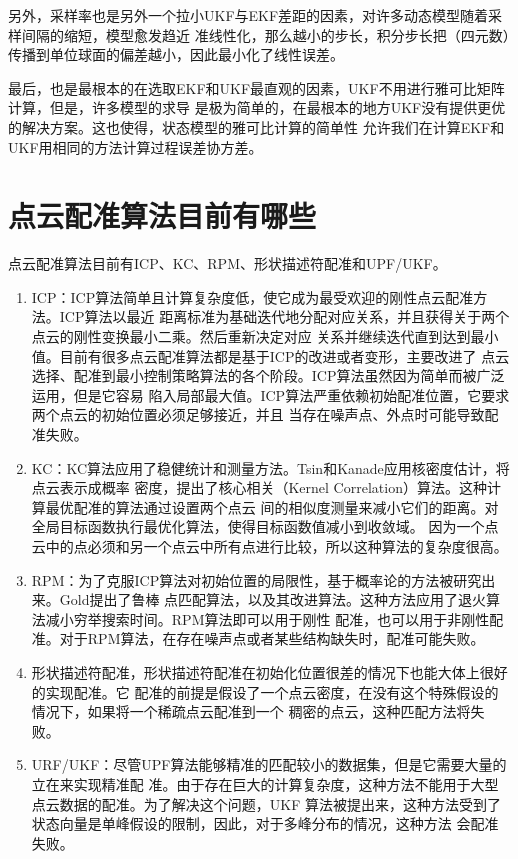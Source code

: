 \documentclass[10pt]{article}
\begin{document}
另外，采样率也是另外一个拉小UKF与EKF差距的因素，对许多动态模型随着采样间隔的缩短，模型愈发趋近
准线性化，那么越小的步长，积分步长把（四元数）传播到单位球面的偏差越小，因此最小化了线性误差。

最后，也是最根本的在选取EKF和UKF最直观的因素，UKF不用进行雅可比矩阵计算，但是，许多模型的求导
是极为简单的，在最根本的地方UKF没有提供更优的解决方案。这也使得，状态模型的雅可比计算的简单性
允许我们在计算EKF和UKF用相同的方法计算过程误差协方差。
\section{点云配准算法目前有哪些}
点云配准算法目前有ICP、KC、RPM、形状描述符配准和UPF/UKF。
\begin{enumerate}
    \item ICP：ICP算法简单且计算复杂度低，使它成为最受欢迎的刚性点云配准方法。ICP算法以最近
    距离标准为基础迭代地分配对应关系，并且获得关于两个点云的刚性变换最小二乘。然后重新决定对应
    关系并继续迭代直到达到最小值。目前有很多点云配准算法都是基于ICP的改进或者变形，主要改进了
    点云选择、配准到最小控制策略算法的各个阶段。ICP算法虽然因为简单而被广泛运用，但是它容易
    陷入局部最大值。ICP算法严重依赖初始配准位置，它要求两个点云的初始位置必须足够接近，并且
    当存在噪声点、外点时可能导致配准失败。
    \item KC：KC算法应用了稳健统计和测量方法。Tsin和Kanade应用核密度估计，将点云表示成概率
    密度，提出了核心相关（Kernel Correlation）算法。这种计算最优配准的算法通过设置两个点云
    间的相似度测量来减小它们的距离。对全局目标函数执行最优化算法，使得目标函数值减小到收敛域。
    因为一个点云中的点必须和另一个点云中所有点进行比较，所以这种算法的复杂度很高。
    \item RPM：为了克服ICP算法对初始位置的局限性，基于概率论的方法被研究出来。Gold提出了鲁棒
    点匹配算法，以及其改进算法。这种方法应用了退火算法减小穷举搜索时间。RPM算法即可以用于刚性
    配准，也可以用于非刚性配准。对于RPM算法，在存在噪声点或者某些结构缺失时，配准可能失败。
    \item 形状描述符配准，形状描述符配准在初始化位置很差的情况下也能大体上很好的实现配准。它
    配准的前提是假设了一个点云密度，在没有这个特殊假设的情况下，如果将一个稀疏点云配准到一个
    稠密的点云，这种匹配方法将失败。
    \item URF/UKF：尽管UPF算法能够精准的匹配较小的数据集，但是它需要大量的立在来实现精准配
    准。由于存在巨大的计算复杂度，这种方法不能用于大型点云数据的配准。为了解决这个问题，UKF
    算法被提出来，这种方法受到了状态向量是单峰假设的限制，因此，对于多峰分布的情况，这种方法
    会配准失败。
\end{enumerate}
\end{document}
